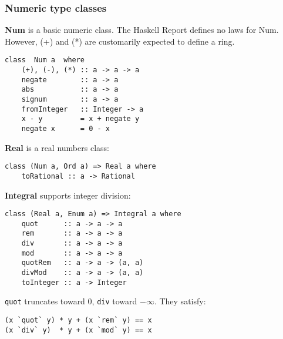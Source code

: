 %

\subsubsection{Numeric type classes}

\textbf{Num} is a basic numeric class.
The Haskell Report defines no laws for Num.
However, (+) and (*) are customarily expected to define a ring.
\begin{verbatim}
class  Num a  where
    (+), (-), (*) :: a -> a -> a
    negate        :: a -> a
    abs           :: a -> a
    signum        :: a -> a
    fromInteger   :: Integer -> a
    x - y         = x + negate y
    negate x      = 0 - x
\end{verbatim}

\textbf{Real} is a real numbers class:
\begin{verbatim}
class (Num a, Ord a) => Real a where
    toRational :: a -> Rational 
\end{verbatim}

\textbf{Integral} supports integer division:
\begin{verbatim}
class (Real a, Enum a) => Integral a where 
    quot      :: a -> a -> a
    rem       :: a -> a -> a
    div       :: a -> a -> a
    mod       :: a -> a -> a
    quotRem   :: a -> a -> (a, a) 
    divMod    :: a -> a -> (a, a) 
    toInteger :: a -> Integer 
\end{verbatim}

\texttt{quot} truncates toward $0$, \texttt{div} toward $-\infty$.
They satisfy:
\begin{verbatim}
(x `quot` y) * y + (x `rem` y) == x
(x `div` y)  * y + (x `mod` y) == x
\end{verbatim}
    





%
